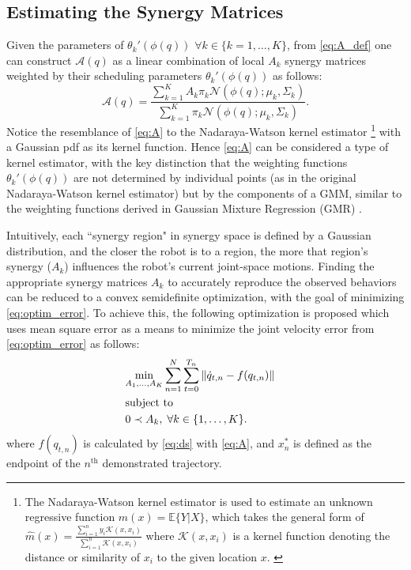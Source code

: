 \documentclass[letterpaper, 10 pt, conference,fleqn]{ieeeconf}
\begin{document}
\subsection{Estimating the Synergy Matrices}
Given the parameters of $\theta_k'(\phi(q))$ $\forall k \in \{k=1,\dots,K\}$, from \eqref{eq:A_def} one can construct $\mathcal{A}(q)$ as a linear combination of local $A_k$ synergy matrices weighted by their scheduling parameters $\theta_k'(\phi(q))$ as follows: 
\begin{equation}
\label{eq:A}
\mathcal{A}(q) = \frac{\sum_{k=1}^K A_k \pi_k\mathcal{N}(\phi(q); \mu_k, \Sigma_k)}{\sum_{k=1}^K \pi_k\mathcal{N} (\phi(q); \mu_k, \Sigma_k)}.
\end{equation} 
Notice the resemblance of \eqref{eq:A} to the Nadaraya-Watson kernel estimator \cite{nadaraya1964regress,watson1964regress}\footnote{The Nadaraya-Watson kernel estimator is used to estimate an unknown regressive function $m(x) = \mathbb{E}\{Y|X\}$, which takes the general form of $\widehat{m}(x) = \frac{\sum_{i=1}^n y_i \mathcal{K}(x,x_i)}{\sum_{i=1}^n \mathcal{K}(x,x_i)}$ where $\mathcal{K}(x,x_i)$ is a kernel function denoting the distance or similarity of $x_i$ to the given location $x$. \cite{nadaraya1964regress,watson1964regress}} with a Gaussian pdf as its kernel function. Hence \eqref{eq:A} can be considered a type of kernel estimator, with the key distinction that the weighting functions $\theta_k'(\phi(q))$ are not determined by individual points (as in the original Nadaraya-Watson kernel estimator) but by the components of a GMM, similar to the weighting functions derived in Gaussian Mixture Regression (GMR) \cite{sung2004gmr}. 

Intuitively, each ``synergy region" in synergy space is defined by a Gaussian distribution, and the closer the robot is to a region, the more that region's synergy ($A_k$) influences the robot's current joint-space motions. Finding the appropriate synergy matrices $A_k$ to accurately reproduce the observed behaviors can be reduced to a convex semidefinite optimization, with the goal of minimizing \eqref{eq:optim_error}. To achieve this, the following optimization is proposed which uses mean square error as a means to minimize the joint velocity error from \eqref{eq:optim_error} as follows:
\begin{equation}
\vspace{-10pt}
\begin{aligned}
&\underset{A_1, \dots, A_K}{\text{min}} 
\sum_{n=1}^N\sum_{t=0}^{T_n} \left \| \dot{q}_{t,n} - f(q_{t,n}) \right \| \\
& \text{subject to}&\\
&  0 \prec A_k, \; \forall k \in \{1, \dots, K\}. &
\end{aligned}
\label{eq:opt}
\end{equation}
where $f(q_{t,n})$ is calculated by %
 \eqref{eq:ds} with \eqref{eq:A}, and $x^*_{n}$ is defined as the endpoint of the $ n^{\text{th}} $ demonstrated trajectory.
\end{document}
